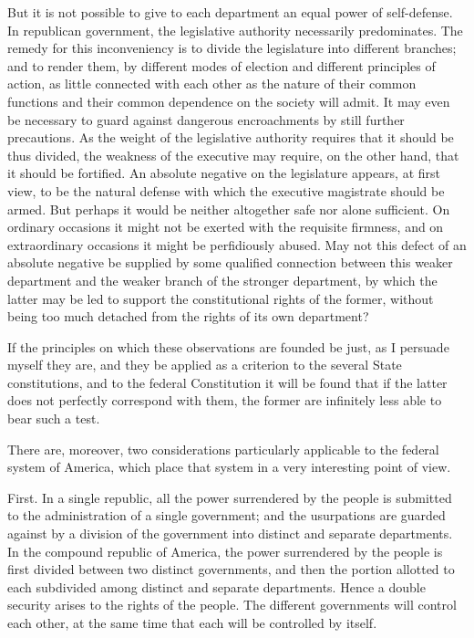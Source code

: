 But it is not possible to give to each department an equal power of self-defense. In republican government, the legislative authority necessarily predominates. The remedy for this inconveniency is to divide the legislature into different branches; and to render them, by different modes of election and different principles of action, as little connected with each other as the nature of their common functions and their common dependence on the society will admit. It may even be necessary to guard against dangerous encroachments by still further precautions. As the weight of the legislative authority requires that it should be thus divided, the weakness of the executive may require, on the other hand, that it should be fortified. An absolute negative on the legislature appears, at first view, to be the natural defense with which the executive magistrate should be armed. But perhaps it would be neither altogether safe nor alone sufficient. On ordinary occasions it might not be exerted with the requisite firmness, and on extraordinary occasions it might be perfidiously abused. May not this defect of an absolute negative be supplied by some qualified connection between this weaker department and the weaker branch of the stronger department, by which the latter may be led to support the constitutional rights of the former, without being too much detached from the rights of its own department?

If the principles on which these observations are founded be just, as I persuade myself they are, and they be applied as a criterion to the several State constitutions, and to the federal Constitution it will be found that if the latter does not perfectly correspond with them, the former are infinitely less able to bear such a test.

There are, moreover, two considerations particularly applicable to the federal system of America, which place that system in a very interesting point of view.

First. In a single republic, all the power surrendered by the people is submitted to the administration of a single government; and the usurpations are guarded against by a division of the government into distinct and separate departments. In the compound republic of America, the power surrendered by the people is first divided between two distinct governments, and then the portion allotted to each subdivided among distinct and separate departments. Hence a double security arises to the rights of the people. The different governments will control each other, at the same time that each will be controlled by itself.

